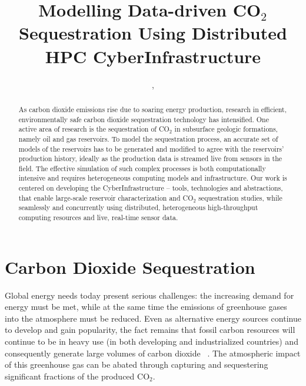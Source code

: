 \documentclass[10pt,conference,final]{IEEEtran}
\begin{document}
\title{Modelling Data-driven CO$_{2}$ Sequestration Using Distributed HPC CyberInfrastructure}

 \author{,
    }


\maketitle

\begin{abstract} As carbon dioxide emissions rise due to soaring energy production, research in efficient, environmentally safe carbon dioxide sequestration technology has intensified.  One active area of research is the sequestration of CO$_2$ in subsurface geologic formations, namely oil and gas reservoirs. To model the sequestration process, an accurate set of models of the reservoirs has to be generated and modified to agree with the reservoirs' production history, ideally as the production data is streamed live from sensors in the field. The effective simulation of such complex processes is both computationally intensive and requires heterogeneous computing models and infrastructure.  Our work is centered on developing the CyberInfrastructure -- tools, technologies and abstractions, that enable large-scale reservoir characterization and CO$_2$ sequestration studies, %
while seamlessly and concurrently using distributed, heterogeneous high-throughput computing resources and live, real-time sensor data.  
\end{abstract}


\section*{Carbon Dioxide Sequestration}
Global energy needs today present serious challenges: the increasing demand for energy 
must be met, while at the same time the 
emissions of greenhouse gases into the atmosphere must be reduced.
Even as alternative energy sources continue to develop and gain 
popularity, the fact remains that fossil carbon resources will continue to be in heavy use 
(in both developing and industrialized countries) and consequently generate 
large volumes of carbon dioxide ~\cite{GeoRPT}. The atmospheric impact of this greenhouse gas 
can be abated through capturing and sequestering significant fractions of the produced 
CO$_2$.
\end{document}

